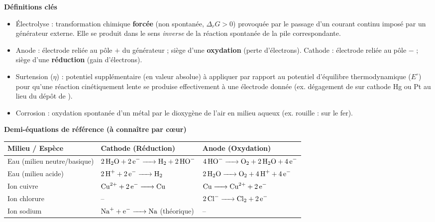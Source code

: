 \documentclass[11pt]{article}
\newcommand{\cle}[1]{{\popxbold\color{popdark}#1}}
\begin{document}
\begin{definition}
\textbf{Définitions clés}
\begin{itemize}
  \item \cle{Électrolyse} : transformation chimique \textbf{forcée} (non spontanée, $\Delta_rG > 0$) provoquée par le passage d'un courant continu imposé par un générateur externe. Elle se produit dans le sens \emph{inverse} de la réaction spontanée de la pile correspondante.
  \item \cle{Anode} : électrode reliée au pôle $+$ du générateur ; siège d'une \textbf{oxydation} (perte d'électrons). \cle{Cathode} : électrode reliée au pôle $-$ ; siège d'une \textbf{réduction} (gain d'électrons).
  \item \cle{Surtension ($\eta$)} : potentiel supplémentaire (en valeur absolue) à appliquer par rapport au potentiel d'équilibre thermodynamique ($E^\circ$) pour qu'une réaction cinétiquement lente se produise effectivement à une électrode donnée (ex. dégagement de  sur cathode Hg ou Pt au lieu du dépôt de ).
  \item \cle{Corrosion} : oxydation spontanée d'un métal par le dioxygène de l'air en milieu aqueux (ex. rouille :  sur le fer).
\end{itemize}

\textbf{Demi-équations de référence (à connaître par cœur)}
\begin{center}
\begin{tabularx}{\linewidth}{|l|X|X|}
\hline
\rowcolor{popblueL} \textbf{Milieu / Espèce} & \textbf{Cathode (Réduction)} & \textbf{Anode (Oxydation)} \\
\hline
Eau (milieu neutre/basique) & $\ce{2H2O + 2e- -> H2 + 2HO-}$ & $\ce{4HO- -> O2 + 2H2O + 4e-}$ \\
\hline
Eau (milieu acide) & $\ce{2H+ + 2e- -> H2}$ & $\ce{2H2O -> O2 + 4H+ + 4e-}$ \\
\hline
Ion cuivre & $\ce{Cu^2+ + 2e- -> Cu}$ & $\ce{Cu -> Cu^2+ + 2e-}$ \\
\hline
Ion chlorure & -- & $\ce{2Cl- -> Cl2 + 2e-}$ \\
\hline
Ion sodium & $\ce{Na+ + e- -> Na}$ (théorique) & -- \\
\hline
\end{tabularx}
\end{center}


\end{definition}
\end{document}
